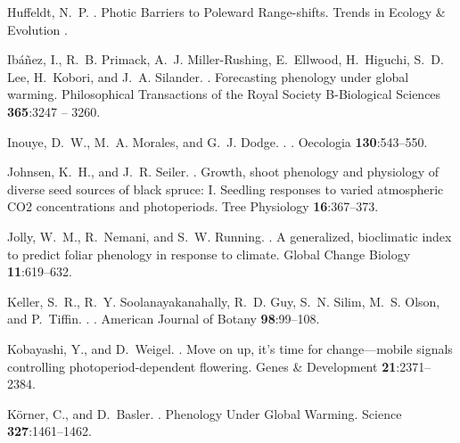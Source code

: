 \documentclass{article}
\begin{document}
\begin{thebibliography}{131}
Huffeldt, N.~P.
.
\newblock Photic Barriers to Poleward Range-shifts.
\newblock Trends in Ecology \& Evolution .

Ib{\'a}{\~n}ez, I., R.~B. Primack, A.~J. Miller-Rushing, E.~Ellwood,
  H.~Higuchi, S.~D. Lee, H.~Kobori, and J.~A. Silander.
.
\newblock Forecasting phenology under global warming.
\newblock Philosophical Transactions of the Royal Society B-Biological Sciences
  {\bf 365}:3247 -- 3260.

Inouye, D.~W., M.~A. Morales, and G.~J. Dodge.
.
.
\newblock Oecologia {\bf 130}:543--550.

Johnsen, K.~H., and J.~R. Seiler.
.
\newblock Growth, shoot phenology and physiology of diverse seed sources of
  black spruce: I. Seedling responses to varied atmospheric CO2 concentrations
  and photoperiods.
\newblock Tree Physiology {\bf 16}:367--373.

Jolly, W.~M., R.~Nemani, and S.~W. Running.
.
\newblock A generalized, bioclimatic index to predict foliar phenology in
  response to climate.
\newblock Global Change Biology {\bf 11}:619--632.

Keller, S.~R., R.~Y. Soolanayakanahally, R.~D. Guy, S.~N. Silim, M.~S. Olson,
  and P.~Tiffin.
.
.
\newblock American Journal of Botany {\bf 98}:99--108.

Kobayashi, Y., and D.~Weigel.
.
\newblock Move on up, it's time for change---mobile signals controlling
  photoperiod-dependent flowering.
\newblock Genes \& Development {\bf 21}:2371--2384.

K{\"o}rner, C., and D.~Basler.
.
\newblock Phenology Under Global Warming.
\newblock Science {\bf 327}:1461--1462.


\end{thebibliography}
\end{document}
